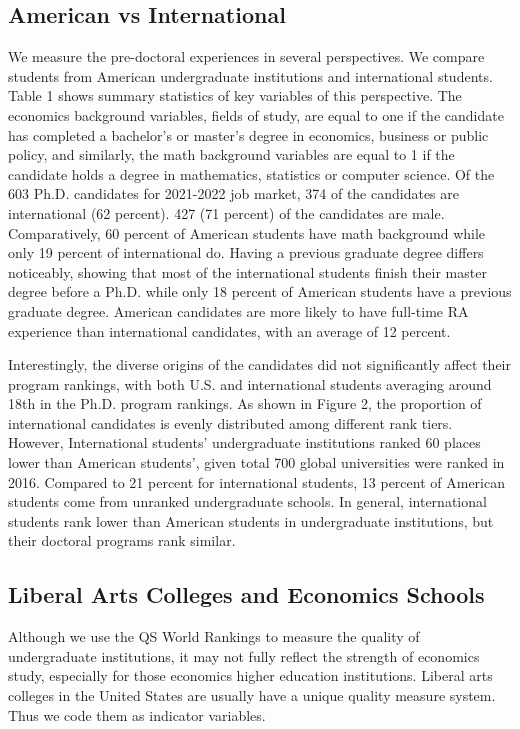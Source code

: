 \documentclass[12pt]{article}
\begin{document}
\subsection{American vs International}
We measure the pre-doctoral experiences in several perspectives. We compare students from American undergraduate institutions and international students. Table 1 shows summary statistics of key variables of this perspective. The economics background variables, fields of study, are equal to one if the candidate has completed a bachelor's or master's degree in economics, business or public policy, and similarly, the math background variables are equal to 1 if the candidate holds a degree in mathematics, statistics or computer science. Of the 603 Ph.D. candidates for 2021-2022 job market, 374 of the candidates are international (62 percent). 427 (71 percent) of the candidates are male. Comparatively, 60 percent of American students have math background while only 19 percent of international do. Having a previous graduate degree differs noticeably, showing that most of the international students finish their master degree before a Ph.D. while only 18 percent of American students have a previous graduate degree. American candidates are more likely to have full-time RA experience than international candidates, with an average of 12 percent.


Interestingly, the diverse origins of the candidates did not significantly affect their program rankings, with both U.S. and international students averaging around 18th in the Ph.D. program rankings. As shown in Figure 2, the proportion of international candidates is evenly distributed among different rank tiers. However, International students' undergraduate institutions ranked 60 places lower than American students', given total 700 global universities were ranked in 2016. Compared to 21 percent for international students, 13 percent of American students come from unranked undergraduate schools. In general, international students rank lower than American students in undergraduate institutions, but their doctoral programs rank similar. 


\clearpage
\subsection{Liberal Arts Colleges and Economics Schools}
Although we use the QS World Rankings to measure the quality of undergraduate institutions, it may not fully reflect the strength of economics study, especially for those economics higher education institutions. Liberal arts colleges in the United States are usually have a unique quality measure system. Thus we code them as indicator variables.

\end{document}
